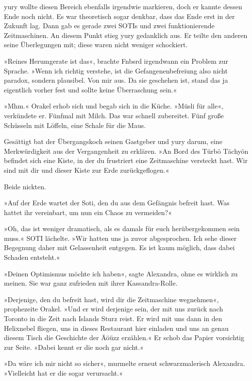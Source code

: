 yury wollte diesen Bereich ebenfalls irgendwie markieren, doch er kannte dessen Ende noch nicht. Es war theoretisch sogar denkbar, dass das Ende erst in der Zukunft lag. Dann gab es gerade zwei SOTIs und zwei funktionierende Zeitmaschinen. An diesem Punkt stieg yury gedanklich aus. Er teilte den anderen seine Überlegungen mit; diese waren nicht weniger schockiert.

»Reines Herumgerate ist das«, brachte Fnbsrd irgendwann ein Problem zur Sprache. »Wenn ich richtig verstehe, ist die Gefangenenbefreiung also nicht paradox, sondern plausibel. Von mir aus. Da sie geschehen ist, stand das ja eigentlich vorher fest und sollte keine Überraschung sein.«

»Mhm.« Orakel erhob sich und begab sich in die Küche. »Müsli für alle«, verkündete er. Fünfmal mit Milch. Das war schnell zubereitet. Fünf große Schüsseln mit Löffeln, eine Schale für die Maus.

Gesättigt bat der Übergangskoch seinen Gastgeber und yury darum, eine Merkwürdigkeit aus der Vergangenheit zu erklären. »An Bord des Türbö Tächyön befindet sich eine Kiste, in der du frustriert eine Zeitmaschine versteckt hast. Wir sind mit dir und dieser Kiste zur Erde zurückgeflogen.«

Beide nickten.

»Auf der Erde wartet der Soti, den du aus dem Gefängnis befreit hast. Was hattet ihr vereinbart, um nun ein Chaos zu vermeiden?«

»Oh, das ist weniger dramatisch, als es damals für euch herübergekommen sein muss.« SOTI lächelte. »Wir hatten uns ja zuvor abgesprochen. Ich sehe dieser Begegnung daher mit Gelassenheit entgegen. Es ist kaum möglich, dass dabei Schaden entsteht.«

»Deinen Optimismus möchte ich haben«, sagte Alexandra, ohne es wirklich zu meinen. Sie war ganz zufrieden mit ihrer Kassandra-Rolle.

»Derjenige, den du befreit hast, wird dir die Zeitmaschine wegnehmen«, prophezeite Orakel. »Und er wird derjenige sein, der mit uns zurück nach Toronto in die Zeit nach Islands Sturz reist. Er wird mit uns dann in den Helixnebel fliegen, uns in dieses Restaurant hier einladen und uns an genau diesem Tisch die Geschichte der Äöüzz erzählen.« Er schob das Papier vorsichtig zur Seite. »Dabei kennt er die noch gar nicht.«

»Da wäre ich mir nicht so sicher«, murmelte erneut schwarzmalerisch Alexandra. »Vielleicht hat er die sogar verursacht.«

